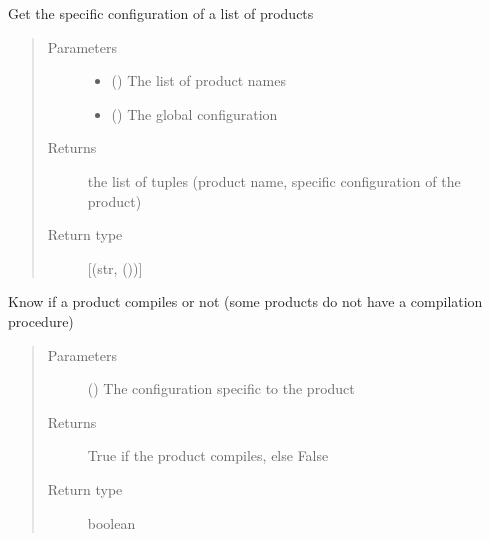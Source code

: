 \documentclass[a4paper,10pt,english]{sphinxmanual}
\begin{document}
\begin{fulllineitems}
\label{\detokenize{commands/apidoc/src:src.product.get_products_infos}}
Get the specific configuration of a list of products
\begin{quote}\begin{description}
\item[{Parameters}] \leavevmode\begin{itemize}
\item {} 
 () \textendash{} The list of product names

\item {} 
 () \textendash{} The global configuration

\end{itemize}

\item[{Returns}] \leavevmode
the list of tuples 
(product name, specific configuration of the product)

\item[{Return type}] \leavevmode
{[}(str, {\hyperref[\detokenize{commands/apidoc/src:src.pyconf.Config}]{}} ()){]}

\end{description}\end{quote}

\end{fulllineitems}


\begin{fulllineitems}
\label{\detokenize{commands/apidoc/src:src.product.product_compiles}}
Know if a product compiles or not 
(some products do not have a compilation procedure)
\begin{quote}\begin{description}
\item[{Parameters}] \leavevmode
{} () \textendash{} The configuration specific to 
the product

\item[{Returns}] \leavevmode
True if the product compiles, else False

\item[{Return type}] \leavevmode
boolean

\end{description}\end{quote}

\end{fulllineitems}
\end{document}

